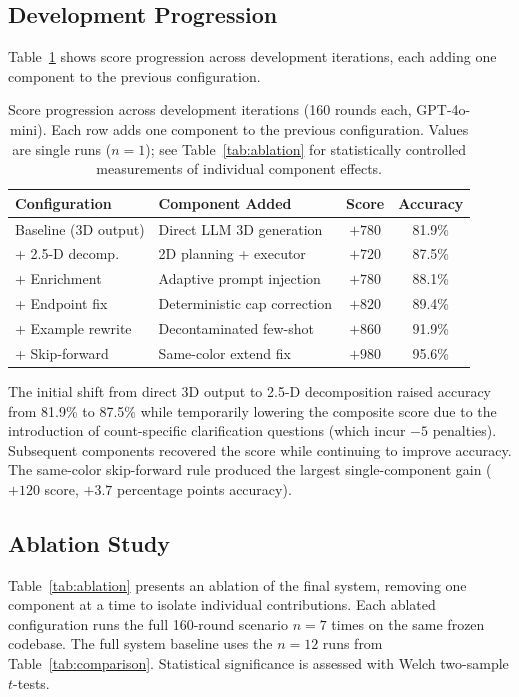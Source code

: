 \documentclass{article}
\begin{document}
\subsection{Development Progression}

Table~\ref{tab:progression} shows score progression across development
iterations, each adding one component to the previous configuration.

\begin{table}[ht]
\centering
\small
\begin{tabular}{@{}llcc@{}}
\toprule
\textbf{Configuration} & \textbf{Component Added} & \textbf{Score} & \textbf{Accuracy} \\
\midrule
Baseline (3D output)  & Direct LLM 3D generation & $+780$ & 81.9\% \\
+ 2.5-D decomp.       & 2D planning + executor   & $+720$ & 87.5\% \\
+ Enrichment          & Adaptive prompt injection & $+780$ & 88.1\% \\
+ Endpoint fix        & Deterministic cap correction & $+820$ & 89.4\% \\
+ Example rewrite     & Decontaminated few-shot   & $+860$ & 91.9\% \\
+ Skip-forward        & Same-color extend fix     & $+980$ & 95.6\% \\
\bottomrule
\end{tabular}
\caption{Score progression across development iterations (160 rounds each,
GPT-4o-mini). Each row adds one component to the previous configuration.
Values are single runs ($n = 1$); see Table~\ref{tab:ablation} for
statistically controlled measurements of individual component effects.}
\label{tab:progression}
\end{table}

The initial shift from direct 3D output to 2.5-D decomposition raised
accuracy from 81.9\% to 87.5\% while temporarily lowering the composite
score due to the introduction of count-specific clarification questions
(which incur $-5$ penalties). Subsequent components recovered the score
while continuing to improve accuracy. The same-color skip-forward rule
produced the largest single-component gain ($+120$ score, $+3.7$ percentage
points accuracy).

\subsection{Ablation Study}

Table~\ref{tab:ablation} presents an ablation of the final system, removing
one component at a time to isolate individual contributions. Each ablated
configuration runs the full 160-round scenario $n = 7$ times on the same
frozen codebase. The full system baseline uses the $n = 12$ runs from
Table~\ref{tab:comparison}. Statistical significance is assessed with
Welch two-sample $t$-tests.
\end{document}
